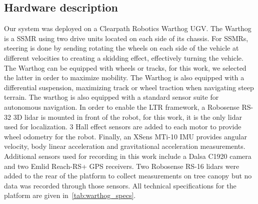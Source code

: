 \subsection{Hardware description}
\label{sec:hardware}

Our system was deployed on a Clearpath Robotics Warthog \ac{UGV}. 
The Warthog is a \ac{SSMR} using two drive units located on each side of its chassis. 
For \acp{SSMR}, steering is done by sending rotating the wheels on each side of the vehicle at different velocities to creating a skidding effect, effectively turning the vehicle.
The Warthog can be equipped with wheels or tracks, for this work, we selected the latter in order to maximize mobility. 
The Warthog is also equipped with a differential suspension, maximizing track or wheel traction when navigating steep terrain.
The warthog is also equipped with a standard sensor suite for autonomous navigation. 
In order to enable the \ac{LTR} framework, a Robosense RS-32 3D lidar is mounted in front of the robot, for this work, it is the only lidar used for localization.
3 Hall effect sensors are added to each motor to provide wheel odometry for the robot. 
Finally, an XSens MTi-10 \ac{IMU} provides angular velocity, body linear acceleration and gravitational acceleration measurements. 
Additional sensors used for recording in this work include a Dalsa C1920 camera and two Emlid Reach-RS+ \ac{GPS} receivers.
Two Robosense RS-16 lidars were added to the rear of the platform to collect measurements on tree canopy but no data was recorded through those sensors. 
All technical specifications for the platform are given in~\autoref{tab:warthog_specs}.

